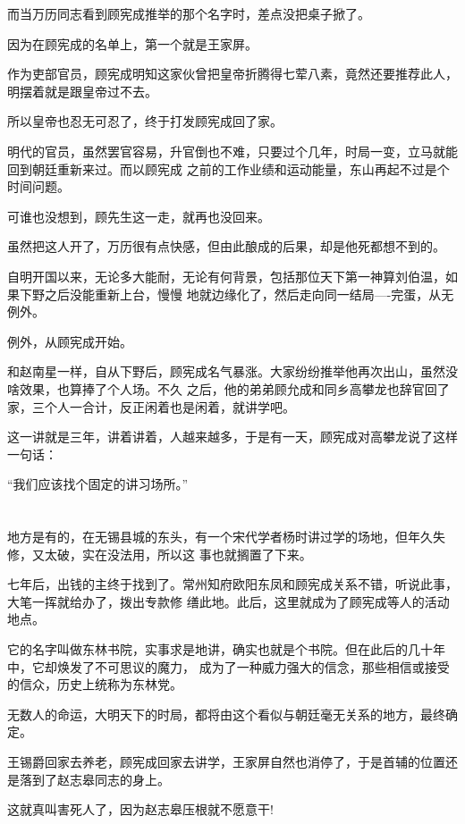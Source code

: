 \documentclass[11pt,a4paper,onecolumn]{article}
\begin{document}
而当万历同志看到顾宪成推举的那个名字时，差点没把桌子掀了。

因为在顾宪成的名单上，第一个就是王家屏。

作为吏部官员，顾宪成明知这家伙曾把皇帝折腾得七荤八素，竟然还要推荐此人，明摆着就是跟皇帝过不去。

所以皇帝也忍无可忍了，终于打发顾宪成回了家。

明代的官员，虽然罢官容易，升官倒也不难，只要过个几年，时局一变，立马就能回到朝廷重新来过。而以顾宪成
之前的工作业绩和运动能量，东山再起不过是个时间问题。

可谁也没想到，顾先生这一走，就再也没回来。

虽然把这人开了，万历很有点快感，但由此酿成的后果，却是他死都想不到的。

自明开国以来，无论多大能耐，无论有何背景，包括那位天下第一神算刘伯温，如果下野之后没能重新上台，慢慢
地就边缘化了，然后走向同一结局----完蛋，从无例外。

例外，从顾宪成开始。

和赵南星一样，自从下野后，顾宪成名气暴涨。大家纷纷推举他再次出山，虽然没啥效果，也算捧了个人场。不久
之后，他的弟弟顾允成和同乡高攀龙也辞官回了家，三个人一合计，反正闲着也是闲着，就讲学吧。

这一讲就是三年，讲着讲着，人越来越多，于是有一天，顾宪成对高攀龙说了这样一句话：

``我们应该找个固定的讲习场所。''

\section[\thesection]{}

地方是有的，在无锡县城的东头，有一个宋代学者杨时讲过学的场地，但年久失修，又太破，实在没法用，所以这
事也就搁置了下来。

七年后，出钱的主终于找到了。常州知府欧阳东凤和顾宪成关系不错，听说此事，大笔一挥就给办了，拨出专款修
缮此地。此后，这里就成为了顾宪成等人的活动地点。

它的名字叫做东林书院，实事求是地讲，确实也就是个书院。但在此后的几十年中，它却焕发了不可思议的魔力，
成为了一种威力强大的信念，那些相信或接受的信众，历史上统称为东林党。

无数人的命运，大明天下的时局，都将由这个看似与朝廷毫无关系的地方，最终确定。

王锡爵回家去养老，顾宪成回家去讲学，王家屏自然也消停了，于是首辅的位置还是落到了赵志皋同志的身上。

这就真叫害死人了，因为赵志皋压根就不愿意干!
\end{document}
